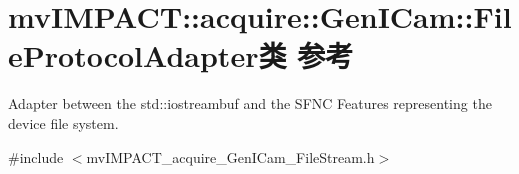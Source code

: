 \hypertarget{classmv_i_m_p_a_c_t_1_1acquire_1_1_gen_i_cam_1_1_file_protocol_adapter}{\section{mv\+I\+M\+P\+A\+C\+T\+:\+:acquire\+:\+:Gen\+I\+Cam\+:\+:File\+Protocol\+Adapter类 参考}
\label{classmv_i_m_p_a_c_t_1_1acquire_1_1_gen_i_cam_1_1_file_protocol_adapter}
}


Adapter between the std\+::iostreambuf and the S\+F\+N\+C Features representing the device file system.  




{\ttfamily \#include $<$mv\+I\+M\+P\+A\+C\+T\+\_\+acquire\+\_\+\+Gen\+I\+Cam\+\_\+\+File\+Stream.\+h$>$}

